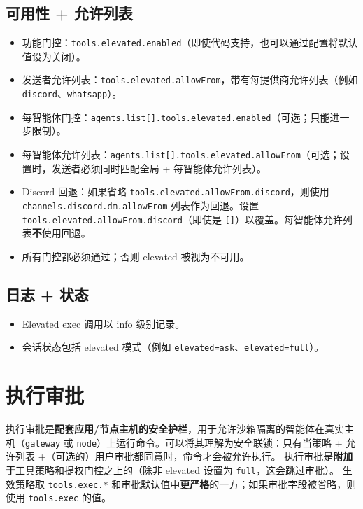 \subsection{可用性 + 允许列表}


\begin{itemize}
  \item 功能门控：\texttt{tools.elevated.enabled}（即使代码支持，也可以通过配置将默认值设为关闭）。
  \item 发送者允许列表：\texttt{tools.elevated.allowFrom}，带有每提供商允许列表（例如 \texttt{discord}、\texttt{whatsapp}）。
  \item 每智能体门控：\texttt{agents.list[].tools.elevated.enabled}（可选；只能进一步限制）。
  \item 每智能体允许列表：\texttt{agents.list[].tools.elevated.allowFrom}（可选；设置时，发送者必须同时匹配全局 + 每智能体允许列表）。
  \item Discord 回退：如果省略 \texttt{tools.elevated.allowFrom.discord}，则使用 \texttt{channels.discord.dm.allowFrom} 列表作为回退。设置 \texttt{tools.elevated.allowFrom.discord}（即使是 \texttt{[]}）以覆盖。每智能体允许列表\textbf{不}使用回退。
  \item 所有门控都必须通过；否则 elevated 被视为不可用。
\end{itemize}


\subsection{日志 + 状态}


\begin{itemize}
  \item Elevated exec 调用以 info 级别记录。
  \item 会话状态包括 elevated 模式（例如 \texttt{elevated=ask}、\texttt{elevated=full}）。
\end{itemize}



\clearpage

\section{执行审批}


执行审批是\textbf{配套应用/节点主机的安全护栏}，用于允许沙箱隔离的智能体在真实主机（\texttt{gateway} 或 \texttt{node}）上运行命令。可以将其理解为安全联锁：只有当策略 + 允许列表 +（可选的）用户审批都同意时，命令才会被允许执行。
执行审批是\textbf{附加于}工具策略和提权门控之上的（除非 elevated 设置为 \texttt{full}，这会跳过审批）。
生效策略取 \texttt{tools.exec.*} 和审批默认值中\textbf{更严格}的一方；如果审批字段被省略，则使用 \texttt{tools.exec} 的值。

